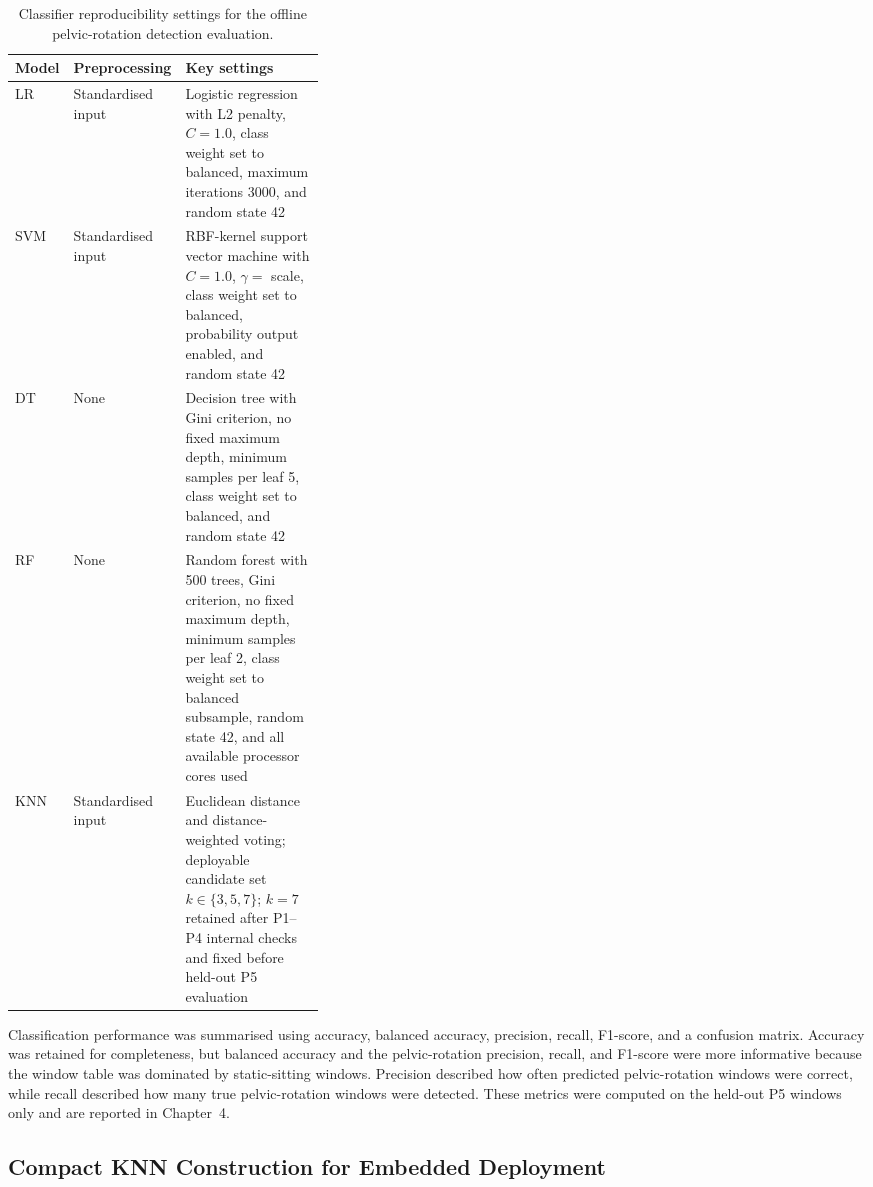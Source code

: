\begin{table}[!htbp]
    \centering
    \scriptsize
    \captionsetup{skip=2pt}
    \caption{Classifier reproducibility settings for the offline pelvic-rotation detection evaluation.}
    \label{tab:objective3_classifier_settings}
    \begin{tabularx}{\linewidth}{@{}p{0.14\linewidth}p{0.22\linewidth}X@{}}
        \toprule
        Model & Preprocessing & Key settings \\
        \midrule
        LR & Standardised input & Logistic regression with L2 penalty, \(C=1.0\), class weight set to balanced, maximum iterations 3000, and random state 42 \\
        SVM & Standardised input & RBF-kernel support vector machine with \(C=1.0\), \(\gamma=\) scale, class weight set to balanced, probability output enabled, and random state 42 \\
        DT & None & Decision tree with Gini criterion, no fixed maximum depth, minimum samples per leaf 5, class weight set to balanced, and random state 42 \\
        RF & None & Random forest with 500 trees, Gini criterion, no fixed maximum depth, minimum samples per leaf 2, class weight set to balanced subsample, random state 42, and all available processor cores used \\
        KNN & Standardised input & Euclidean distance and distance-weighted voting; deployable candidate set \(k \in \{3,5,7\}\); \(k=7\) retained after P1--P4 internal checks and fixed before held-out P5 evaluation \\
        \bottomrule
    \end{tabularx}
\end{table}

Classification performance was summarised using accuracy, balanced accuracy, precision, recall, F1-score, and a confusion matrix. Accuracy was retained for completeness, but balanced accuracy and the pelvic-rotation precision, recall, and F1-score were more informative because the window table was dominated by static-sitting windows. Precision described how often predicted pelvic-rotation windows were correct, while recall described how many true pelvic-rotation windows were detected. These metrics were computed on the held-out P5 windows only and are reported in Chapter~4.

\subsection{Compact KNN Construction for Embedded Deployment}\label{sec:compact_knn_construction}

